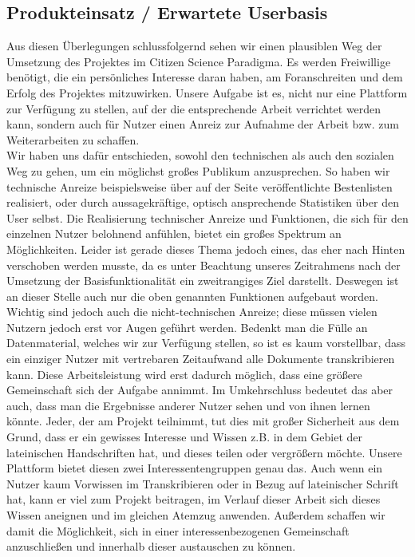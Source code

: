 \documentclass{article}
\begin{document}
\subsection{Produkteinsatz / Erwartete Userbasis}
Aus diesen Überlegungen schlussfolgernd sehen wir einen plausiblen Weg der Umsetzung des Projektes im Citizen Science Paradigma.
Es werden Freiwillige benötigt, die ein persönliches Interesse daran haben, am Foranschreiten und dem Erfolg des Projektes mitzuwirken.
Unsere Aufgabe ist es, nicht nur eine Plattform zur Verfügung zu stellen, auf der die entsprechende Arbeit verrichtet werden kann,
sondern auch für Nutzer einen Anreiz zur Aufnahme der Arbeit bzw. zum Weiterarbeiten zu schaffen.\\
Wir haben uns dafür entschieden, sowohl den technischen als auch den sozialen Weg zu gehen, um ein möglichst großes Publikum anzusprechen.
So haben wir technische Anreize beispielsweise über auf der Seite veröffentlichte Bestenlisten realisiert, oder durch aussagekräftige,
optisch ansprechende Statistiken über den User selbst. Die Realisierung technischer Anreize und Funktionen,
die sich für den einzelnen Nutzer belohnend anfühlen, bietet ein großes Spektrum an Möglichkeiten.
Leider ist gerade dieses Thema jedoch eines, das eher nach Hinten verschoben werden musste,
da es unter Beachtung unseres Zeitrahmens nach der Umsetzung der Basisfunktionalität ein zweitrangiges Ziel darstellt.
Deswegen ist an dieser Stelle auch nur die oben genannten Funktionen aufgebaut worden.\\
Wichtig sind jedoch auch die nicht-technischen Anreize; diese müssen vielen Nutzern jedoch erst vor Augen geführt werden.
Bedenkt man die Fülle an Datenmaterial, welches wir zur Verfügung stellen, so ist es kaum vorstellbar,
dass ein einziger Nutzer mit vertrebaren Zeitaufwand alle Dokumente transkribieren kann.
Diese Arbeitsleistung wird erst dadurch möglich, dass eine größere Gemeinschaft sich der Aufgabe annimmt.
Im Umkehrschluss bedeutet das aber auch, dass man die Ergebnisse anderer Nutzer sehen und von ihnen lernen könnte.
Jeder, der am Projekt teilnimmt, tut dies mit großer Sicherheit aus dem Grund,
dass er ein gewisses Interesse und Wissen z.B. in dem Gebiet der lateinischen Handschriften hat, und dieses teilen oder vergrößern möchte.
Unsere Plattform bietet diesen zwei Interessentengruppen genau das.
Auch wenn ein Nutzer kaum Vorwissen im Transkribieren oder in Bezug auf lateinischer Schrift hat, kann er viel zum Projekt beitragen,
im Verlauf dieser Arbeit sich dieses Wissen aneignen und im gleichen Atemzug anwenden.
Außerdem schaffen wir damit die Möglichkeit, sich in einer interessenbezogenen Gemeinschaft anzuschließen und innerhalb dieser austauschen zu können.
\end{document}
